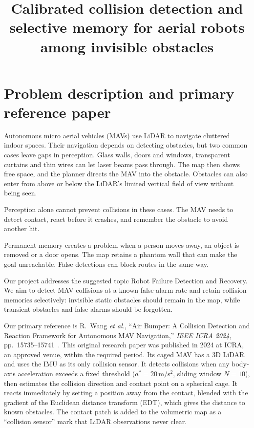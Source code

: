\documentclass[conference,10pt]{IEEEtran}
\begin{document}
\title{Calibrated collision detection and selective memory for aerial robots among invisible obstacles}

\author{
}

\maketitle

\section{Problem description and primary reference paper}

Autonomous micro aerial vehicles (MAVs) use LiDAR to navigate cluttered indoor spaces. Their navigation depends on detecting obstacles, but two common cases leave gaps in perception. Glass walls, doors and windows, transparent curtains and thin wires can let laser beams pass through. The map then shows free space, and the planner directs the MAV into the obstacle. Obstacles can also enter from above or below the LiDAR's limited vertical field of view without being seen.

Perception alone cannot prevent collisions in these cases. The MAV needs to detect contact, react before it crashes, and remember the obstacle to avoid another hit.

Permanent memory creates a problem when a person moves away, an object is removed or a door opens. The map retains a phantom wall that can make the goal unreachable. False detections can block routes in the same way.

Our project addresses the suggested topic Robot Failure Detection and Recovery. We aim to detect MAV collisions at a known false-alarm rate and retain collision memories selectively: invisible static obstacles should remain in the map, while transient obstacles and false alarms should be forgotten.

Our primary reference is R.~Wang \emph{et al.}, ``Air Bumper: A Collision Detection and Reaction Framework for Autonomous MAV Navigation,'' \emph{IEEE ICRA 2024}, pp.~15735--15741~\cite{airbumper}. This original research paper was published in 2024 at ICRA, an approved venue, within the required period. Its caged MAV has a 3D LiDAR and uses the IMU as its only collision sensor. It detects collisions when any body-axis acceleration exceeds a fixed threshold ($a^*=20$\,m/s$^2$, sliding window $N=10$), then estimates the collision direction and contact point on a spherical cage. It reacts immediately by setting a position away from the contact, blended with the gradient of the Euclidean distance transform (EDT), which gives the distance to known obstacles. The contact patch is added to the volumetric map as a ``collision sensor'' mark that LiDAR observations never clear.
\end{document}

